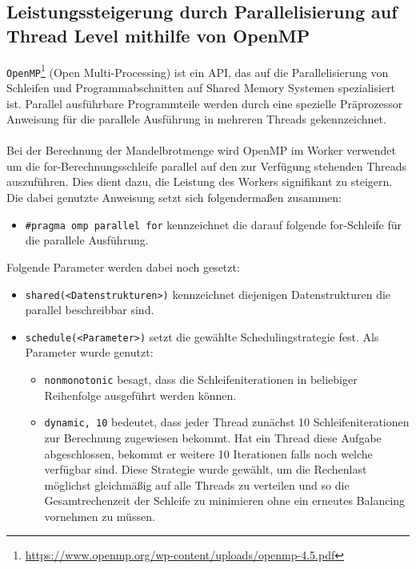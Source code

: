 \subsection{Leistungssteigerung durch Parallelisierung auf Thread Level mithilfe von OpenMP}

\verb|OpenMP|\footnote{\url{https://www.openmp.org/wp-content/uploads/openmp-4.5.pdf}} (Open Multi-Processing) ist ein API, das auf die Parallelisierung von Schleifen und Programmabschnitten auf Shared Memory Systemen spezialisiert ist. Parallel ausführbare Programmteile werden durch eine spezielle Präprozessor Anweisung für die parallele Ausführung in mehreren Threads gekennzeichnet.
\\ \\
Bei der Berechnung der Mandelbrotmenge wird OpenMP im Worker verwendet um die for-Berechnungsschleife parallel auf den zur Verfügung stehenden Threads auszuführen. Dies dient dazu, die Leistung des Workers signifikant zu steigern. Die dabei genutzte Anweisung setzt sich folgendermaßen zusammen:

\begin{itemize}
	\item \verb|#pragma omp parallel for| kennzeichnet die darauf folgende for-Schleife für die parallele Ausführung.
\end{itemize}

Folgende Parameter werden dabei noch gesetzt:

\begin{itemize}
	\item \verb|shared(<Datenstrukturen>)| kennzeichnet diejenigen Datenstrukturen die parallel beschreibbar sind.

	\item \verb|schedule(<Parameter>)| setzt die gewählte Schedulingstrategie fest. Als Parameter wurde genutzt:

	      \begin{itemize}
		      \item \verb|nonmonotonic| besagt, dass die Schleifeniterationen in beliebiger Reihenfolge ausgeführt werden können.

		      \item \verb|dynamic, 10| bedeutet, dass jeder Thread zunächst 10 Schleifeniterationen zur Berechnung zugewiesen bekommt. Hat ein Thread diese Aufgabe abgeschlossen, bekommt er weitere 10 Iterationen falls noch welche verfügbar sind. Diese Strategie wurde gewählt, um die Rechenlast möglichst gleichmäßig auf alle Threads zu verteilen und so die Gesamtrechenzeit der Schleife zu minimieren ohne ein erneutes Balancing vornehmen zu müssen.
	      \end{itemize}
\end{itemize}


